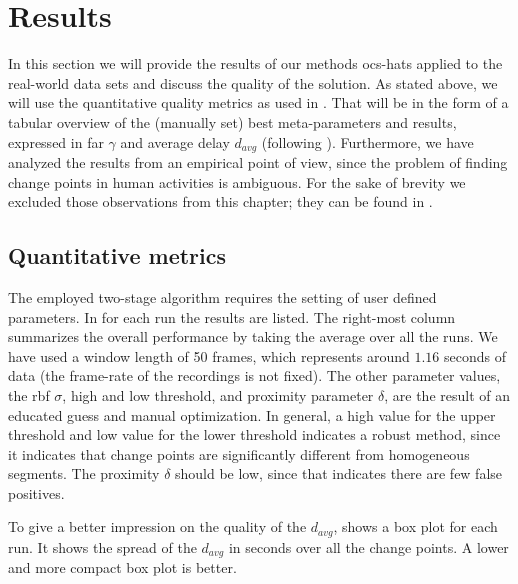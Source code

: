 \section{Results}\label{sec:real_world_results}
In this section we will provide the results of our methods \gls{ocs-hats} applied to the real-world data sets and discuss the quality of the solution.
As stated above, we will use the quantitative quality metrics as used in .
That will be in the form of a tabular overview of the (manually set) best meta-parameters and results, expressed in \gls{far} $\gamma$ and average delay $d_{avg}$ (following ).
Furthermore, we have analyzed the results from an empirical point of view, since the problem of finding change points in human activities is ambiguous.
For the sake of brevity we excluded those observations from this chapter; they can be found in .

\subsection{Quantitative metrics}
The employed two-stage algorithm requires the setting of user defined parameters.
In  for each run the results are listed.
The right-most column summarizes the overall performance by taking the average over all the runs.
We have used a window length of 50 frames, which represents around $1.16$ seconds of data (the frame-rate of the recordings is not fixed).
The other parameter values, \ie the \gls{rbf} $\sigma$, high and low threshold, and proximity parameter $\delta$, are the result of an educated guess and manual optimization.
In general, a high value for the upper threshold and low value for the lower threshold indicates a robust method, since it indicates that change points are significantly different from homogeneous segments.
The proximity $\delta$ should be low, since that indicates there are few false positives.

To give a better impression on the quality of the $d_{avg}$,  shows a box plot for each run.
It shows the spread of the $d_{avg}$ in seconds over all the change points.
A lower and more compact box plot is better.

